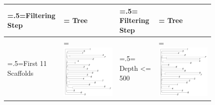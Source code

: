 \documentclass{article}
\begin{document}
\begin{figure}
\centering
\begin{tabularx}{\textwidth}{ >{\hsize=.5\hsize\linewidth=\hsize}X >{\hsize=1.5\hsize\linewidth=\hsize}X | >{\hsize=.5\hsize\linewidth=\hsize}X >{\hsize=1.5\hsize\linewidth=\hsize}X }
\toprule
Filtering Step & Tree & Filtering Step & Tree \\
\midrule
First 11 Scaffolds & \includegraphics[width=\linewidth]{01-first-11-scaffolds.pdf} &
Depth <= 500 & \includegraphics[width=\linewidth]{02-depth.pdf} \\

\end{tabularx}
\end{figure}
\end{document}
